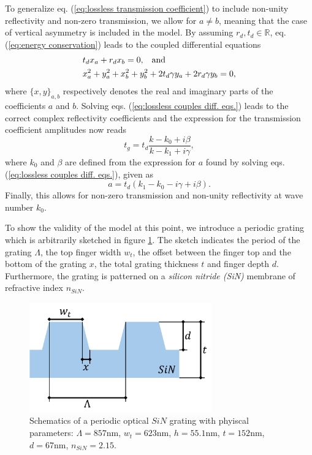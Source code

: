 To generalize eq. (\ref{eq:lossless transmission coefficient}) to include non-unity reflectivity and non-zero transmission, we allow for $a \neq b$\cite{Bykov}\cite{Darki2}\cite{Parthenopoulos}, meaning that the case of vertical asymmetry is included in the model\cite{Popov}. By assuming $r_d,t_d \in \mathbb{R}$, eq. (\ref{eq:energy conservation}) leads to the coupled differential equations
\begin{equation}
    \begin{split}
        &t_d x_a + r_d x_b = 0, \hspace{0.3cm} \text{and} \\
        &x_a^2 + y_a^2 + x_b^2 + y_b^2 + 2 t_d \gamma y_a + 2 r_d \gamma y_b = 0,
    \end{split}
    \label{eq:lossless couples diff. eqs.}
\end{equation}
where $\{x,y\}_{a,b}$ respectively denotes the real and imaginary parts of the coefficients $a$ and $b$. Solving eqs. (\ref{eq:lossless couples diff. eqs.}) leads to the correct complex reflectivity coefficients and the expression for the transmission coefficient amplitudes now reads
\begin{equation}
    t_g = t_d \frac{k - k_0 + i \beta}{k - k_1 + i \gamma},
    \label{eq:transmission_coefficients_non_zero_values}
\end{equation}
where $k_0$ and $\beta$ are defined from the expression for $a$ found by solving eqs. (\ref{eq:lossless couples diff. eqs.}), given as
\begin{equation}
    a = t_d (k_1 - k_0 - i \gamma + i \beta).
\end{equation}
Finally, this allows for non-zero transmission and non-unity reflectivity at wave number $k_0$.

To show the validity of the model at this point, we introduce a periodic grating which is arbitrarily sketched in figure \ref{fig:MIST_grating_sketch}. The sketch indicates the period of the grating $\Lambda$, the top finger width $w_t$, the offset between the finger top and the bottom of the grating $x$, the total grating thickness $t$ and finger depth $d$. Furthermore, the grating is patterned on a \emph{silicon nitride (SiN)} membrane  of refractive index $n_{SiN}$. 

\begin{figure}[h!]
    \centering
    \includegraphics[width=0.7\textwidth]{figures/grating_MIST_sketch.pdf}
    \caption{Schematics of a periodic optical $SiN$ grating with phyiscal parameters: $\Lambda = 857$nm, $w_t = 623$nm, $h = 55.1$nm, $t = 152$nm, $d = 67$nm, $n_{SiN} = 2.15$.}
    \label{fig:MIST_grating_sketch}
\end{figure}


